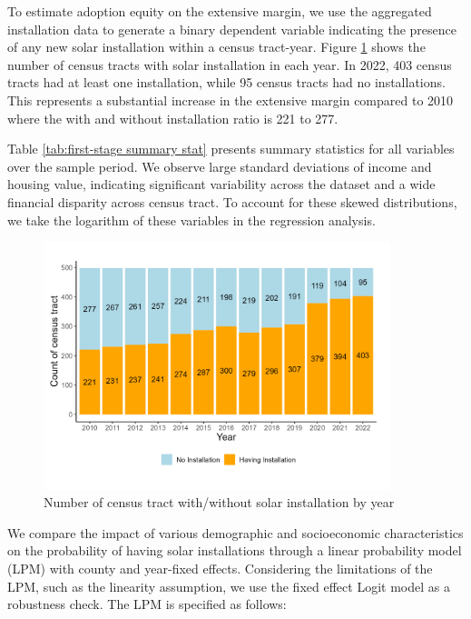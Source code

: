 \documentclass[11pt,twoside,letterpaper]{article}
\begin{document}
To estimate adoption equity on the extensive margin, we use the aggregated installation data to generate a binary dependent variable indicating the presence of any new solar installation within a census tract-year. Figure \ref{fig:stack_installation} shows the number of census tracts with solar installation in each year. In 2022, 403 census tracts had at least one installation, while 95 census tracts had no installations. This represents a substantial increase in the extensive margin compared to 2010 where the with and without installation ratio is 221 to 277.

Table \ref{tab:first-stage summary stat} presents summary statistics for all variables over the sample period. We observe large standard deviations of income and housing value, indicating significant variability across the dataset and a wide financial disparity across census tract. To account for these skewed distributions, we take the logarithm of these variables in the regression analysis. 

\begin{figure}[!ht]
    \centering
\includegraphics[width=0.9\textwidth]{figures/stack_installation.png}
    \caption{Number of census tract with/without solar installation by year}
    \label{fig:stack_installation}
\end{figure}

We compare the impact of various demographic and socioeconomic characteristics on the probability of having solar installations through a linear probability model (LPM) with county and year-fixed effects. Considering the limitations of the LPM, such as the linearity assumption, we use the fixed effect Logit model as a robustness check. The LPM is specified as follows:
\end{document}

